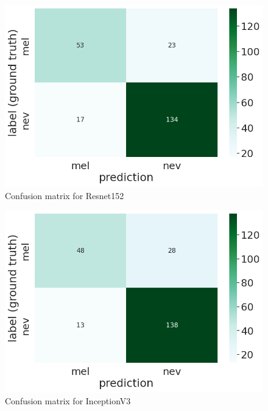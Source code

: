 \documentclass[12pt, a4paper]{article}
\begin{document}
\begin{figure}[h]
    \centering
    \setlength{\fboxsep}{8pt}
    \includegraphics[scale=0.5, fbox]{images/matrix-resnet152.png}
    \caption{Confusion matrix for Resnet152}
    \label{fig:matrix-resnet152}
\end{figure}

\begin{figure}[h]
    \centering
    \setlength{\fboxsep}{8pt}
    \includegraphics[scale=0.5, fbox]{images/matrix-inceptionv3.png}
    \caption{Confusion matrix for InceptionV3}
    \label{fig:matrix-inceptionv3}
\end{figure}
\end{document}
